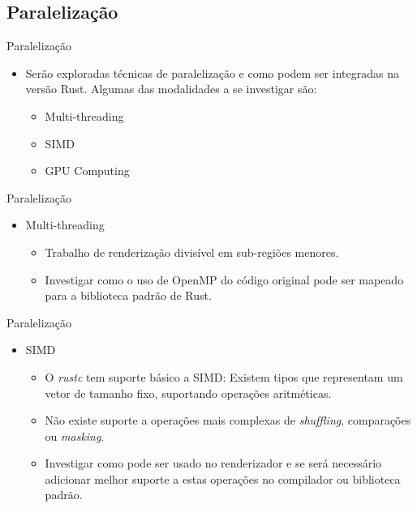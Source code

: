 \documentclass{beamer}
\begin{document}
\subsection{Paralelização}
\begin{frame}{Paralelização}
	\begin{itemize}
		\item Serão exploradas técnicas de paralelização e como podem ser integradas na versão Rust. Algumas das modalidades a se investigar são:
		\begin{itemize}
			\item Multi-threading
			\item SIMD
			\item GPU Computing
		\end{itemize}
	\end{itemize}
\end{frame}

\begin{frame}{Paralelização}
	\begin{itemize}
		\item Multi-threading
		\begin{itemize}
			\item Trabalho de renderização divisível em sub-regiões menores.
			\item Investigar como o uso de OpenMP do código original pode ser mapeado para a biblioteca padrão de Rust.
		\end{itemize}
	\end{itemize}
\end{frame}

\begin{frame}{Paralelização}
	\begin{itemize}
		\item SIMD
		\begin{itemize}
			\item O \emph{rustc} tem suporte básico a SIMD: Existem tipos que representam um vetor de tamanho fixo, suportando operações aritméticas.
			\item Não existe suporte a operações mais complexas de \emph{shuffling}, comparações ou \emph{masking}.
			\item Investigar como pode ser usado no renderizador e se será necessário adicionar melhor suporte a estas operações no compilador ou biblioteca padrão.
		\end{itemize}
	\end{itemize}
\end{frame}
\end{document}
